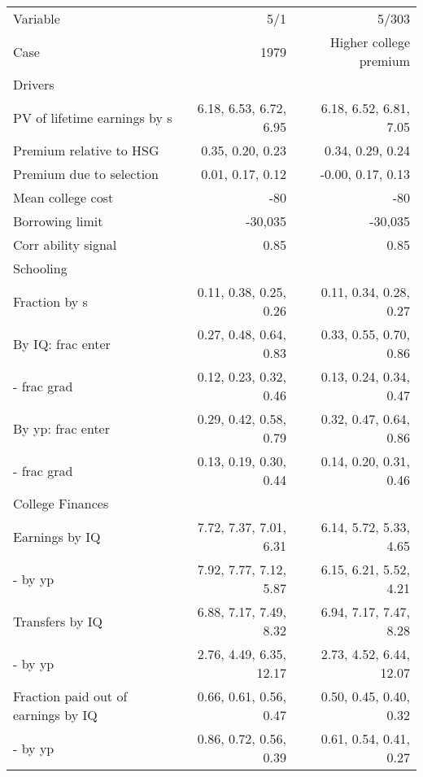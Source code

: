\begin{tabular}{lrr}
\hline
Variable & 5/1  & 5/303  \\ 
Case & 1979  & Higher college premium  \\ 
Drivers &   &   \\ 
PV of lifetime earnings by s & 6.18, 6.53, 6.72, 6.95  & 6.18, 6.52, 6.81, 7.05  \\ 
Premium relative to HSG & 0.35, 0.20, 0.23  & 0.34, 0.29, 0.24  \\ 
Premium due to selection & 0.01, 0.17, 0.12  & -0.00, 0.17, 0.13  \\ 
Mean college cost & -80  & -80  \\ 
Borrowing limit & -30,035  & -30,035  \\ 
Corr ability signal & 0.85  & 0.85  \\ 
\hline
Schooling &   &   \\ 
Fraction by s & 0.11, 0.38, 0.25, 0.26  & 0.11, 0.34, 0.28, 0.27  \\ 
By IQ: frac enter & 0.27, 0.48, 0.64, 0.83  & 0.33, 0.55, 0.70, 0.86  \\ 
- frac grad & 0.12, 0.23, 0.32, 0.46  & 0.13, 0.24, 0.34, 0.47  \\ 
By yp: frac enter & 0.29, 0.42, 0.58, 0.79  & 0.32, 0.47, 0.64, 0.86  \\ 
- frac grad & 0.13, 0.19, 0.30, 0.44  & 0.14, 0.20, 0.31, 0.46  \\ 
\hline
College Finances &   &   \\ 
Earnings by IQ & 7.72, 7.37, 7.01, 6.31  & 6.14, 5.72, 5.33, 4.65  \\ 
- by yp & 7.92, 7.77, 7.12, 5.87  & 6.15, 6.21, 5.52, 4.21  \\ 
Transfers by IQ & 6.88, 7.17, 7.49, 8.32  & 6.94, 7.17, 7.47, 8.28  \\ 
- by yp & 2.76, 4.49, 6.35, 12.17  & 2.73, 4.52, 6.44, 12.07  \\ 
Fraction paid out of earnings by IQ & 0.66, 0.61, 0.56, 0.47  & 0.50, 0.45, 0.40, 0.32  \\ 
- by yp & 0.86, 0.72, 0.56, 0.39  & 0.61, 0.54, 0.41, 0.27  \\ 
\hline
\end{tabular}%
